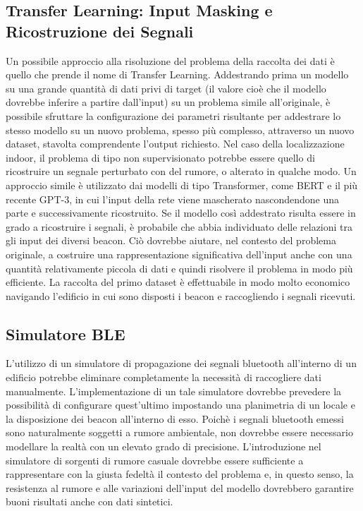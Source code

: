 \subsection{Transfer Learning: Input Masking e Ricostruzione dei Segnali}
Un possibile approccio alla risoluzione del problema della raccolta dei dati è
quello che prende il nome di Transfer Learning. Addestrando prima un modello su
una grande quantità di dati privi di target (il valore cioè che il modello
dovrebbe inferire a partire dall'input) su un problema simile all'originale, è
possibile sfruttare la configurazione dei parametri risultante per addestrare
lo stesso modello su un nuovo problema, spesso più complesso, attraverso un
nuovo dataset, stavolta comprendente l'output richiesto. Nel caso della
localizzazione indoor, il problema di tipo non supervisionato potrebbe essere
quello di ricostruire un segnale perturbato con del rumore, o alterato in
qualche modo. Un approccio simile è utilizzato dai modelli di tipo
Transformer\cite{attention}, come BERT\cite{bert} e il più recente
GPT-3\cite{gpt3}, in cui l'input della rete viene mascherato nascondendone una
parte e successivamente ricostruito. Se il modello così addestrato risulta
essere in grado a ricostruire i segnali, è probabile che abbia individuato
delle relazioni tra gli input dei diversi beacon. Ciò dovrebbe aiutare, nel
contesto del problema originale, a costruire una rappresentazione significativa
dell'input anche con una quantità relativamente piccola di dati e quindi
risolvere il problema in modo più efficiente. La raccolta del primo dataset è
effettuabile in modo molto economico navigando l'edificio in cui sono disposti
i beacon e raccogliendo i segnali ricevuti.
\subsection{Simulatore BLE}
L'utilizzo di un simulatore di propagazione dei segnali bluetooth all'interno
di un edificio potrebbe eliminare completamente la necessità di raccogliere
dati manualmente. L'implementazione di un tale simulatore dovrebbe prevedere
la possibilità di configurare quest'ultimo impostando una planimetria di un
locale e la disposizione dei beacon all'interno di esso. Poichè i segnali
bluetooth emessi sono naturalmente soggetti a rumore ambientale, non dovrebbe
essere necessario modellare la realtà con un elevato grado di precisione.
L'introduzione nel simulatore di sorgenti di rumore casuale dovrebbe essere
sufficiente a rappresentare con la giusta fedeltà il contesto del problema e,
in questo senso, la resistenza al rumore e alle variazioni dell'input del
modello dovrebbero garantire buoni risultati anche con dati sintetici.
